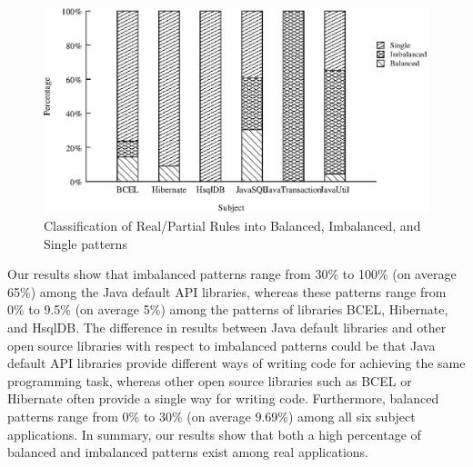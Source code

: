 \begin{figure}[t]
\centering
\includegraphics[scale=0.60,clip]{figs/Alattin_Patterns.eps}\vspace*{-1ex}
\caption{\label{fig:balimbal}Classification of Real/Partial Rules into Balanced, Imbalanced, and Single patterns}\vspace*{-5ex}
\end{figure}

Our results show that imbalanced patterns range from 30\% to 100\% (on average 65\%) among the Java default API libraries, whereas these patterns range from 0\% to 9.5\% (on average 5\%) among the patterns of libraries BCEL, Hibernate, and HsqlDB. The difference in results between Java default libraries and other open source libraries with respect to imbalanced patterns could be that Java default API libraries provide different ways of writing code for achieving the same programming task, whereas other open source libraries such as BCEL or Hibernate often provide a single way for writing code. Furthermore, balanced patterns range from 0\% to 30\% (on average 9.69\%) among all six subject applications. In summary, our results show that both a high percentage of balanced and imbalanced patterns exist among real applications. 

